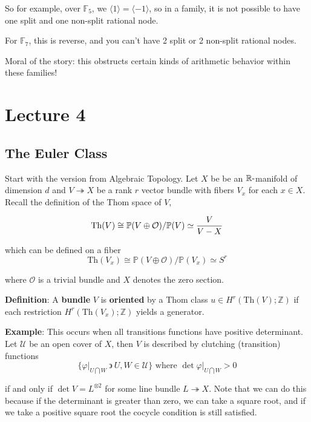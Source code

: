 \documentclass[11pt]{scrreprt}
\theoremstyle{definition}
\newcommand{\RR}[0]{{\mathbb{R}}}
\newcommand{\ZZ}[0]{{\mathbb{Z}}}
\newcommand{\FF}[0]{{\mathbb{F}}}
\newcommand{\PP}[0]{{\mathbb{P}}}
\newcommand{\suchthat}[0]{{~\backepsilon ~}}
\newcommand{\generators}[1]{\langle{#1}\rangle}
\newcommand{\theset}[1]{\{{#1}\}}
\newcommand{\restrictionof}[2]{{\left.{#1}\right|_{#2}}}
\newcommand{\intersect}[0]{\bigcap}
\newcommand{\tensor}[0]{\otimes}
\newcommand{\dash}[0]{{\hbox{-}}}
\newcommand{\homotopic}[0]{\simeq}
\newcommand{\surjects}[0]{\twoheadrightarrow}
\begin{document}
So for example, over \(\FF_5\), we \(\generators{1} = \generators{-1}\),
so in a family, it is not possible to have one split and one non-split
rational node.

For \(\FF_7\), this is reverse, and you can't have 2 split or 2
non-split rational nodes.

Moral of the story: this obstructs certain kinds of arithmetic behavior
within these families!

\hypertarget{lecture-4}{%
\chapter{Lecture 4}\label{lecture-4}}

\hypertarget{the-euler-class}{%
\section{The Euler Class}\label{the-euler-class}}

Start with the version from Algebraic Topology. Let \(X\) be be an
\(\RR\dash\)manifold of dimension \(d\) and \(V\surjects X\) be a rank
\(r\) vector bundle with fibers \(V_x\) for each \(x\in X\). Recall the
definition of the Thom space of \(V\),

\[
\text{Th}(V) \cong \PP(V\oplus \mathcal O)  / \PP(V) \homotopic \frac{V}{V-X} \\
\]

which can be defined on a fiber \[
\text{Th}(V_x) \cong \PP(V\oplus \mathcal O)  / \PP(V_x) \homotopic S^r
\]

where \(\mathcal O\) is a trivial bundle and \(X\) denotes the zero
section.

\textbf{Definition}: A \textbf{bundle} \(V\) is \textbf{oriented} by a
Thom class \(u\in H^r(\text{Th}(V); \ZZ)\) if each restriction
\(H^r(\text{Th}(V_x); \ZZ)\) yields a generator.

\textbf{Example}: This occurs when all transitions functions have
positive determinant. Let \(\mathcal U\) be an open cover of \(X\), then
\(V\) is described by clutching (transition) functions \[
\theset{\restrictionof{\varphi}{U \intersect W} \suchthat U,W\in\mathcal U} \text{ where } \det \restrictionof{\varphi}{U\intersect W} > 0
\]

if and only if \(\det V = L^{\tensor 2}\) for some line bundle
\(L \surjects X\). Note that we can do this because if the determinant
is greater than zero, we can take a square root, and if we take a
positive square root the cocycle condition is still satisfied.
\end{document}
